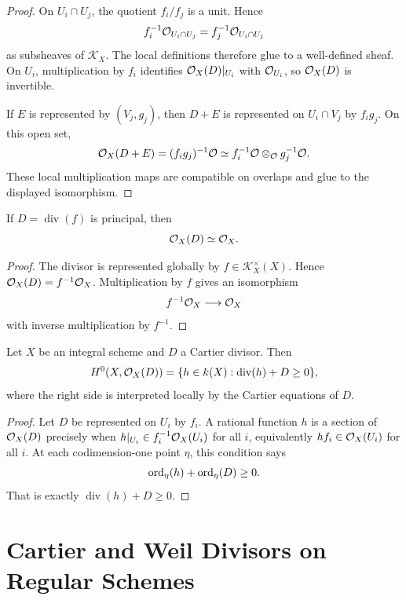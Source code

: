 \begin{proof}
On \(U_i\cap U_j\), the quotient \(f_i/f_j\) is a unit.  Hence
\[
    f_i^{-1}\mathcal{O}_{U_i\cap U_j}
    =
    f_j^{-1}\mathcal{O}_{U_i\cap U_j}
\]
as subsheaves of \(\mathcal K_X\).  The local definitions therefore glue to a
well-defined sheaf.  On \(U_i\), multiplication by \(f_i\) identifies
\(\mathcal{O}_X(D)|_{U_i}\) with \(\mathcal{O}_{U_i}\), so \(\mathcal{O}_X(D)\) is invertible.

If \(E\) is represented by \((V_j,g_j)\), then \(D+E\) is represented on
\(U_i\cap V_j\) by \(f_i g_j\).  On this open set,
\[
    \mathcal{O}_X(D+E)=(f_i g_j)^{-1}\mathcal{O}
    \simeq f_i^{-1}\mathcal{O}\otimes_{\mathcal{O}} g_j^{-1}\mathcal{O}.
\]
These local multiplication maps are compatible on overlaps and glue to the
displayed isomorphism.
\end{proof}

\begin{proposition}
If \(D=\operatorname{div}(f)\) is principal, then
\[
    \mathcal{O}_X(D)\simeq \mathcal{O}_X.
\]
\end{proposition}

\begin{proof}
The divisor is represented globally by \(f\in\mathcal K_X^\times(X)\).  Hence
\(\mathcal{O}_X(D)=f^{-1}\mathcal{O}_X\).  Multiplication by \(f\) gives an isomorphism
\[
    f^{-1}\mathcal{O}_X\longrightarrow \mathcal{O}_X
\]
with inverse multiplication by \(f^{-1}\).
\end{proof}

\begin{proposition}
Let \(X\) be an integral scheme and \(D\) a Cartier divisor.  Then
\[
    H^0(X,\mathcal{O}_X(D))
    =
    \{h\in k(X): \operatorname{div}(h)+D\ge0\},
\]
where the right side is interpreted locally by the Cartier equations of \(D\).
\end{proposition}

\begin{proof}
Let \(D\) be represented on \(U_i\) by \(f_i\).  A rational function \(h\) is a
section of \(\mathcal{O}_X(D)\) precisely when \(h|_{U_i}\in f_i^{-1}\mathcal{O}_X(U_i)\) for
all \(i\), equivalently \(hf_i\in\mathcal{O}_X(U_i)\) for all \(i\).  At each
codimension-one point \(\eta\), this condition says
\[
    \operatorname{ord}_\eta(h)+\operatorname{ord}_\eta(D)\ge0.
\]
That is exactly \(\operatorname{div}(h)+D\ge0\).
\end{proof}

\section{Cartier and Weil Divisors on Regular Schemes}

